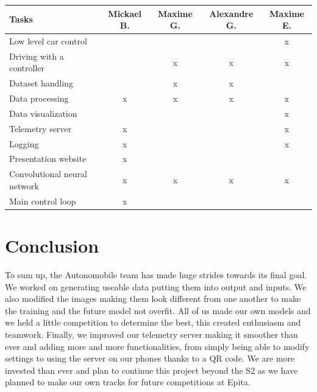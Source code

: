 \documentclass[12pt]{article}
\begin{document}
\begin{tabular}{|l|c|c|c|c|} 
\hline
Tasks                        & Mickael B. & Maxime G. & Alexandre G. & Maxime E.  \\ 
\hline
Low level car control        &            &           &              & x          \\ 
\hline
Driving with a controller    &            & x         & x            & x          \\ 
\hline
Dataset handling             &            & x         & x            &            \\ 
\hline
Data processing              & x          & x         & x            & x          \\ 
\hline
Data visualization           &            &           &              & x          \\ 
\hline
Telemetry server             & x          &           &              & x          \\ 
\hline
Logging                      & x          &           &              & x          \\ 
\hline
Presentation website         & x          &           &              &            \\ 
\hline
Convolutional neural network & x          & x         & x            & x          \\ 
\hline
Main control loop            & x          &           &              &            \\
\hline
\end{tabular}

\section {Conclusion}
To sum up, the Autonomobile team has made huge strides towards its final goal. We worked on generating useable data putting them into output and inputs. We also modified the images making them look different from one another to make the training and the future model not overfit. All of us made our own models and we held a little competition to determine the best, this created enthusiasm and teamwork. Finally, we improved our telemetry server making it smoother than ever and adding more and more functionalities, from simply being able to modify settings to using the server on our phones thanks to a QR code.  
We are more invested than ever and plan to continue this project beyond the S2 as we have planned to make our own tracks for future competitions at Epita. 
\end{document}
